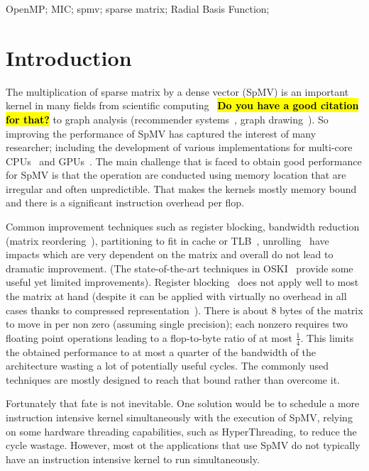 \documentclass[10pt,conference,compsocconf]{IEEEtran}
\newcommand{\todo}[1]{{\color{red}\textbf{\hl{#1}}\xspace}}
\begin{document}
\begin{IEEEkeywords}
OpenMP; MIC; spmv; sparse matrix; Radial Basis Function;
\end{IEEEkeywords}

\IEEEpeerreviewmaketitle

\section{Introduction}
The multiplication of sparse matrix by a dense vector (SpMV) is an
important kernel in many fields from scientific computing~\cite{} \todo{Do you have a good citation for that?}
to graph analysis (recommender systems~\cite{Brin98}, graph
drawing~\cite{Koren05}). So improving the performance of SpMV has
captured the interest of many researcher; including the development of
various implementations for multi-core
CPUs~\cite{Buluc2009SPAA,Williams07} and GPUs~\cite{Bell08,
  conf/ipps/KreutzerHWFBB12,
  journals/concurrency/VazquezFG11,kumar2012accelerating}. The main
challenge that is faced to obtain good performance for SpMV is that
the operation are conducted using memory location that are irregular
and often unpredictible. That makes the kernels mostly memory
bound and there is a significant instruction overhead per flop.

Common improvement techniques such as register blocking, bandwidth
reduction (matrix reordering~\cite{Cuthill69}), partitioning to fit in
cache or TLB~\cite{Nishtala07,Temam:1992:CBS:147877.148091,conf/ppsc/Toledo97},
unrolling~\cite{Mellor-Crummey04} have impacts which are very
dependent on the matrix and overall do not lead to dramatic
improvement. (The state-of-the-art techniques in OSKI~\cite{Vuduc05}
provide some useful yet limited improvements). Register blocking~\cite{conf/ppsc/Toledo97} does
not apply well to most the matrix at hand (despite it can be applied
with virtually no overhead in all cases thanks to compressed
representation~\cite{Buluc11}). There is about 8 bytes of the matrix to move
in per non zero (assuming single precision); each nonzero requires two
floating point operations leading to a flop-to-byte ratio of at most
$\frac{1}{4}$. This limits the obtained performance to at most a
quarter of the bandwidth of the architecture wasting a lot of
potentially useful cycles. The commonly used techniques are mostly
designed to reach that bound rather than overcome it.

Fortunately that fate is not inevitable. One solution would be to
schedule a more instruction intensive kernel simultaneously with the
execution of SpMV, relying on some hardware threading capabilities,
such as HyperThreading, to reduce the cycle wastage. However, most ot
the applications that use SpMV do not typically have an instruction
intensive kernel to run simultaneously.
\end{document}
